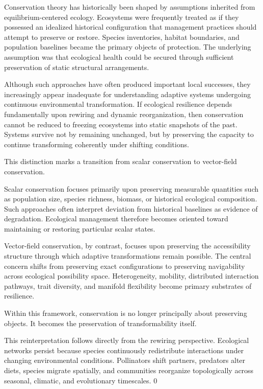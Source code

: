 \documentclass[11pt,a4paper]{article}
\begin{document}
Conservation theory has historically been shaped by assumptions inherited from equilibrium-centered ecology. Ecosystems were frequently treated as if they possessed an idealized historical configuration that management practices should attempt to preserve or restore. Species inventories, habitat boundaries, and population baselines became the primary objects of protection. The underlying assumption was that ecological health could be secured through sufficient preservation of static structural arrangements.

Although such approaches have often produced important local successes, they increasingly appear inadequate for understanding adaptive systems undergoing continuous environmental transformation. If ecological resilience depends fundamentally upon rewiring and dynamic reorganization, then conservation cannot be reduced to freezing ecosystems into static snapshots of the past. Systems survive not by remaining unchanged, but by preserving the capacity to continue transforming coherently under shifting conditions.

This distinction marks a transition from scalar conservation to vector-field conservation.

Scalar conservation focuses primarily upon preserving measurable quantities such as population size, species richness, biomass, or historical ecological composition. Such approaches often interpret deviation from historical baselines as evidence of degradation. Ecological management therefore becomes oriented toward maintaining or restoring particular scalar states.

Vector-field conservation, by contrast, focuses upon preserving the accessibility structure through which adaptive transformations remain possible. The central concern shifts from preserving exact configurations to preserving navigability across ecological possibility space. Heterogeneity, mobility, distributed interaction pathways, trait diversity, and manifold flexibility become primary substrates of resilience.

Within this framework, conservation is no longer principally about preserving objects. It becomes the preservation of transformability itself.

This reinterpretation follows directly from the rewiring perspective. Ecological networks persist because species continuously redistribute interactions under changing environmental conditions. Pollinators shift partners, predators alter diets, species migrate spatially, and communities reorganize topologically across seasonal, climatic, and evolutionary timescales. 0
\end{document}
